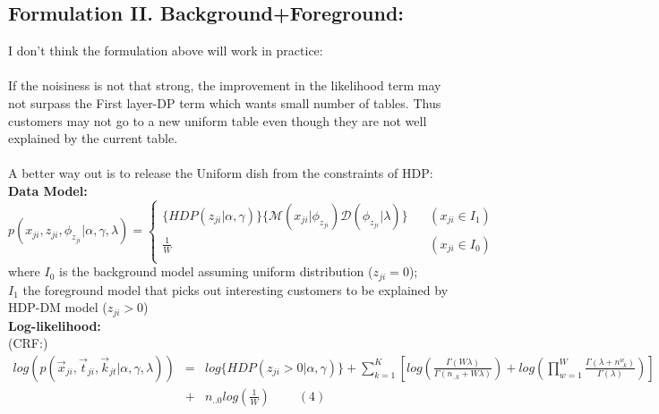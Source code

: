 \documentclass{article}
\begin{document}
\begin{spacing}{1.1}
\section{Formulation II. Background+Foreground:}
I don't think the formulation above will work in practice:\\\\
If the noisiness is not that strong, the improvement in the likelihood term may not surpass the First layer-DP term which
wants small number of tables.
Thus customers may not go to a new uniform table even though they are not well explained by the current table.\\\\
A better way out is to release the Uniform dish from the constraints of HDP:\\
{\bf Data Model:}
\[
p(x_{ji},z_{ji},\phi_{z_{ji}}|\alpha,\gamma,\lambda)
=
\left\{ \begin{array}{ll}
\{HDP(z_{ji}|\alpha,\gamma)\}\{\mathcal{M}(x_{ji}|\phi_{z_{ji}})\mathcal{D}(\phi_{z_{ji}}|\lambda)\}
 & \ \mbox{ ${(x_{ji}\in I_{1})}$}\\
\frac{1}{W}
 & \ \mbox{ ${(x_{ji}\in I_{0})}$}\\
\end{array} \right.  \]
where $I_{0}$ is the background model assuming uniform distribution ($z_{ji}=0$);\\
$I_{1}$ the foreground model that picks out interesting customers to be explained by HDP-DM model ($z_{ji}>0$)\\
{\bf Log-likelihood:}\\
(CRF:)\\
\begin{eqnarray*}
log(p(\vec x_{ji},\vec t_{ji},\vec k_{jt}|\alpha,\gamma,\lambda))
&=&log \{HDP(z_{ji}>0|\alpha,\gamma)\}+\sum_{k=1}^{K} [log(\frac{\Gamma(W\lambda)}{\Gamma(n_{..k}+W\lambda)})+log(\displaystyle\prod_{w=1}^{W}\frac{\Gamma(\lambda+n_{..k}^{w})}{\Gamma(\lambda)})]\\
&+&n_{..0}log(\frac{1}{W})\ \ \ \ \ \ \ \ \ \ (4) 
\end{eqnarray*}

\end{spacing}
\end{document}
